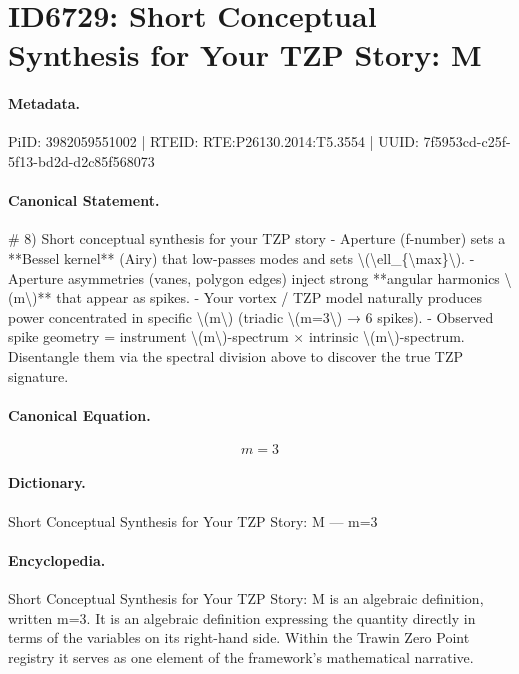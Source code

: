 \section*{ID6729: Short Conceptual Synthesis for Your TZP Story: M}
\paragraph{Metadata.}
PiID: 3982059551002 | RTEID: RTE:P26130.2014:T5.3554 | UUID: 7f5953cd-c25f-5f13-bd2d-d2c85f568073

\paragraph{Canonical Statement.}
\# 8) Short conceptual synthesis for your TZP story - Aperture (f-number) sets a **Bessel kernel** (Airy) that low-passes modes and sets \textbackslash{}(\textbackslash{}ell\_\{\textbackslash{}max\}\textbackslash{}). - Aperture asymmetries (vanes, polygon edges) inject strong **angular harmonics \textbackslash{}(m\textbackslash{})** that appear as spikes. - Your vortex / TZP model naturally produces power concentrated in specific \textbackslash{}(m\textbackslash{}) (triadic \textbackslash{}(m=3\textbackslash{}) → 6 spikes). - Observed spike geometry = instrument \textbackslash{}(m\textbackslash{})-spectrum × intrinsic \textbackslash{}(m\textbackslash{})-spectrum. Disentangle them via the spectral division above to discover the true TZP signature.

\paragraph{Canonical Equation.}
\[
m=3
\]

\paragraph{Dictionary.}
Short Conceptual Synthesis for Your TZP Story: M — m=3

\paragraph{Encyclopedia.}
Short Conceptual Synthesis for Your TZP Story: M is an algebraic definition, written m=3. It is an algebraic definition expressing the quantity directly in terms of the variables on its right-hand side. Within the Trawin Zero Point registry it serves as one element of the framework's mathematical narrative.
